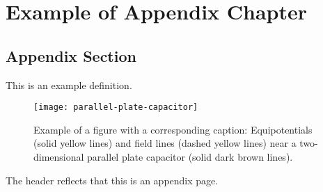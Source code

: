 \chapter{Example of Appendix Chapter} \label{appendix:example}

\section{Appendix Section}%
\label{sec:Appendix Section}

\begin{definition}
    This is an example definition.
\end{definition}

\begin{figure}[!ht]
    \centering
    \texttt{[image: parallel-plate-capacitor]}
    \caption{Example of a figure with a corresponding caption: Equipotentials \textcolor{Gray40}{(solid yellow lines)} and field lines \textcolor{Gray40}{(dashed yellow lines)} near a two-dimensional parallel plate capacitor \textcolor{Gray40}{(solid dark brown lines)}.}
    \label{fig:parallel-plate-capacitor}
\end{figure}

\clearpage

\begin{remark}
    The header reflects that this is an appendix page.
\end{remark}
